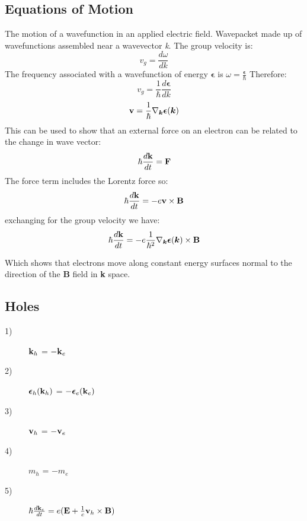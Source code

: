 		\subsection{Equations of Motion}
				The motion of a wavefunction in an applied electric field.   Wavepacket made up of wavefunctions assembled near a wavevector \textit{k}.  The group velocity is:
				\begin{equation}
					v_g = \frac{d\omega}{dk}
				\end{equation}
			The frequency associated with a wavefunction of energy $\boldsymbol{\epsilon}$ is $\omega = \frac{\boldsymbol{\epsilon}}{\hbar}$  Therefore:
				\begin{equation}
					v_g = \frac{1}{\hbar}\frac{d\boldsymbol{\epsilon}}{dk}
				\end{equation}
				\begin{equation}
					\textrm{\textbf{v}} = \frac{1}{\hbar} \nabla_{\boldsymbol{k}} \boldsymbol{\epsilon}(\boldsymbol{k})
				\end{equation}
				This can be used to show that an external force on an electron can be related to the change in wave vector:
				\begin{equation}
					\hbar \frac{d\textrm{\textbf{k}}}{dt} = \textrm{\textbf{F}}
				\end{equation}
				The force term includes the Lorentz force so:
				\begin{equation}
					\hbar \frac{d\textrm{\textbf{k}}}{dt} = -e\textrm{\textbf{v}} \times \textrm{\textbf{B}}
				\end{equation}
				exchanging for the group velocity we have:
				\begin{equation}
					\hbar \frac{d\textrm{\textbf{k}}}{dt} = -e\frac{1}{\hbar^2} \nabla_{\boldsymbol{k}} \boldsymbol{\epsilon}(\boldsymbol{k}) \times \textrm{\textbf{B}}
				\end{equation}
				
				Which shows that electrons move along constant energy surfaces normal to the direction of the \textbf{B} field in \textbf{k} space.
		
		\subsection{Holes}
			\begin{description}
				\item[1)] $\textrm{\textbf{k}}_h$ = $-\textrm{\textbf{k}}_e$
				\item[2)] $\boldsymbol{\epsilon}_h(\textrm{\textbf{k}}_h)$ = $-\boldsymbol{\epsilon}_e(\textrm{\textbf{k}}_e)$
				\item[3)] $\textrm{\textbf{v}}_h$ = $-\textrm{\textbf{v}}_e$
				\item[4)] $m_h$ = $-m_e$
				\item[5)] $\hbar\frac{d\textrm{\textbf{k}}_e}{dt} = e(\textrm{\textbf{E}} + \frac{1}{c}\textrm{\textbf{v}}_h\times\textrm{\textbf{B}})$
			\end{description}
